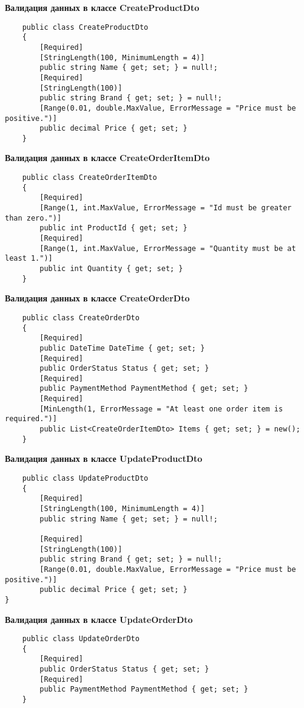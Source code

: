 \documentclass[a4paper,12pt]{report}
\begin{document}
\textbf{Валидация данных в классе CreateProductDto}
\begin{verbatim}
    public class CreateProductDto
    {
        [Required]
        [StringLength(100, MinimumLength = 4)]
        public string Name { get; set; } = null!;
        [Required]
        [StringLength(100)]
        public string Brand { get; set; } = null!;
        [Range(0.01, double.MaxValue, ErrorMessage = "Price must be positive.")]
        public decimal Price { get; set; }
    }
\end{verbatim}

\textbf{Валидация данных в классе CreateOrderItemDto}
\begin{verbatim}
    public class CreateOrderItemDto
    {
        [Required]
        [Range(1, int.MaxValue, ErrorMessage = "Id must be greater than zero.")]
        public int ProductId { get; set; }
        [Required]
        [Range(1, int.MaxValue, ErrorMessage = "Quantity must be at least 1.")]
        public int Quantity { get; set; }
    }
\end{verbatim}

\textbf{Валидация данных в классе CreateOrderDto}
\begin{verbatim}
    public class CreateOrderDto
    {
        [Required]
        public DateTime DateTime { get; set; }
        [Required]
        public OrderStatus Status { get; set; }
        [Required]
        public PaymentMethod PaymentMethod { get; set; }
        [Required]
        [MinLength(1, ErrorMessage = "At least one order item is required.")]
        public List<CreateOrderItemDto> Items { get; set; } = new();
    }
\end{verbatim}

\textbf{Валидация данных в классе UpdateProductDto}
\begin{verbatim}
    public class UpdateProductDto
    {
        [Required]
        [StringLength(100, MinimumLength = 4)]
        public string Name { get; set; } = null!;

        [Required]
        [StringLength(100)]
        public string Brand { get; set; } = null!;
        [Range(0.01, double.MaxValue, ErrorMessage = "Price must be positive.")]
        public decimal Price { get; set; }
}
\end{verbatim}

\textbf{Валидация данных в классе UpdateOrderDto}
\begin{verbatim}
    public class UpdateOrderDto
    {
        [Required]
        public OrderStatus Status { get; set; }
        [Required]
        public PaymentMethod PaymentMethod { get; set; }
    }
\end{verbatim}
\end{document}
